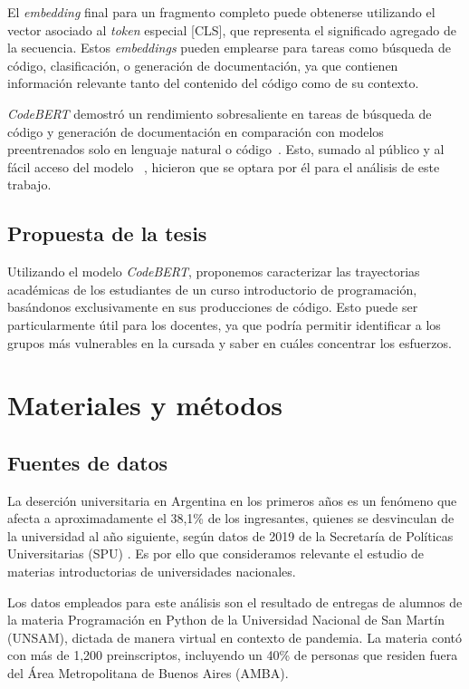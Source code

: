 \documentclass[11pt,a4paper,twoside,openany]{tesis}
\begin{document}
El \emph{embedding} final para un fragmento completo puede obtenerse utilizando el vector asociado al \emph{token} especial [CLS], que representa el significado agregado de la secuencia. Estos \emph{embeddings} pueden emplearse para tareas como búsqueda de código, clasificación, o generación de documentación, ya que contienen información relevante tanto del contenido del código como de su contexto.

\emph{CodeBERT} demostró un rendimiento sobresaliente en tareas de búsqueda de código y generación de documentación en comparación con modelos preentrenados solo en lenguaje natural o código~\cite{codeBert}. Esto, sumado al público y al fácil acceso del modelo~\cite{codeBert-repo} , hicieron que se optara por él para el análisis de este trabajo.


\section{Propuesta de la tesis}

Utilizando el modelo \emph{CodeBERT}, proponemos caracterizar las trayectorias académicas de los estudiantes de un curso introductorio de programación, basándonos exclusivamente en sus producciones de código. Esto puede ser particularmente útil para los docentes, ya que podría permitir identificar a los grupos más vulnerables en la cursada y saber en cuáles concentrar los esfuerzos.

\chapter{Materiales y métodos}
\section{Fuentes de datos}



La deserción universitaria en Argentina en los primeros años es un fenómeno que afecta a aproximadamente el 38,1\% de los ingresantes, quienes se desvinculan de la universidad al año siguiente, según datos de 2019 de la Secretaría de Políticas Universitarias (SPU) \cite{permanencia}. Es por ello que consideramos relevante el estudio de materias introductorias de universidades nacionales.

Los datos empleados para este análisis son el resultado de entregas de alumnos de la materia Programación en Python de la Universidad Nacional de San Martín (UNSAM), dictada de manera virtual en contexto de pandemia.  La materia contó con más de 1,200 preinscriptos, incluyendo  un  40\%  de  personas  que  residen  fuera  del  Área  Metropolitana de Buenos Aires (AMBA).
\end{document}

